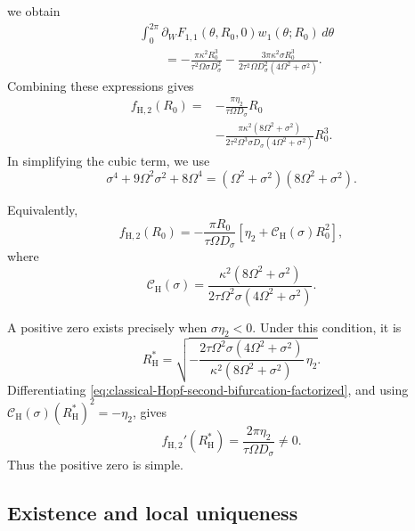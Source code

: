 \documentclass[11pt,reqno]{amsart}
\theoremstyle{plain}
\theoremstyle{definition}
\theoremstyle{remark}
\begin{document}
we obtain
\[
\begin{aligned}
&\int_0^{2\pi}
\partial_W F_{1,1}(\theta,R_0,0)
w_1(\theta;R_0)\,d\theta\\
&\qquad=
-\frac{\pi\kappa^2R_0^3}
{\tau^2\Omega\sigma D_\sigma^2}
-\frac{3\pi\kappa^2\sigma R_0^3}
{2\tau^2\Omega D_\sigma^2(4\Omega^2+\sigma^2)}.
\end{aligned}
\]
Combining these expressions gives
\[
\begin{aligned}
f_{\mathrm H,2}(R_0)
={}&
-\frac{\pi\eta_2}{\tau\Omega D_\sigma}R_0\\
&-\frac{\pi\kappa^2(8\Omega^2+\sigma^2)}
{2\tau^2\Omega^3\sigma D_\sigma(4\Omega^2+\sigma^2)}
R_0^3.
\end{aligned}
\]
In simplifying the cubic term, we use
\[
\sigma^4+9\Omega^2\sigma^2+8\Omega^4
=
(\Omega^2+\sigma^2)(8\Omega^2+\sigma^2).
\]

Equivalently,
\begin{equation}
\label{eq:classical-Hopf-second-bifurcation-factorized}
f_{\mathrm H,2}(R_0)
=
-\frac{\pi R_0}{\tau\Omega D_\sigma}
\left[\eta_2+\mathcal C_{\mathrm H}(\sigma)R_0^2\right],
\end{equation}
where
\[
\mathcal C_{\mathrm H}(\sigma)
=
\frac{\kappa^2(8\Omega^2+\sigma^2)}
{2\tau\Omega^2\sigma(4\Omega^2+\sigma^2)}.
\]

A positive zero exists precisely when
$\sigma\eta_2<0.$
Under this condition, it is
\begin{equation}
\label{eq:classical-Hopf-amplitude}
R_{\mathrm H}^*
=
\sqrt{
-\frac{2\tau\Omega^2\sigma(4\Omega^2+\sigma^2)}
{\kappa^2(8\Omega^2+\sigma^2)}\,\eta_2
}.
\end{equation}
Differentiating
\eqref{eq:classical-Hopf-second-bifurcation-factorized},
and using
$\mathcal C_{\mathrm H}(\sigma)(R_{\mathrm H}^*)^2=-\eta_2$,
gives
\begin{equation}
\label{eq:classical-Hopf-simple-root}
f_{\mathrm H,2}'(R_{\mathrm H}^*)
=
\frac{2\pi\eta_2}{\tau\Omega D_\sigma}\neq0.
\end{equation}
Thus the positive zero is simple.

\subsection{Existence and local uniqueness}
\label{subsec:classical-Hopf-existence-proof}
\end{document}
